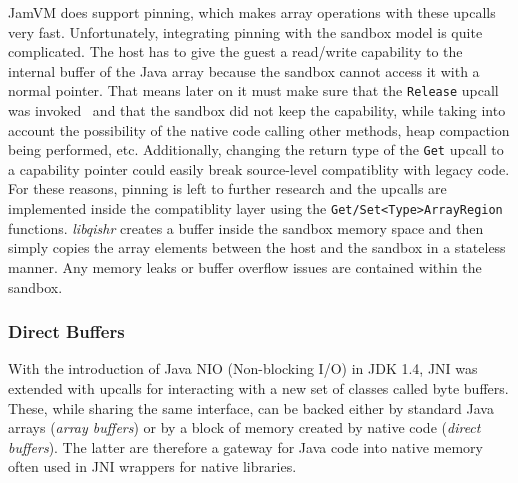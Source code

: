 \documentclass[a4paper,12pt,twoside,openright]{report}
\newcommand{\tool}[1]{\emph{#1}}
\newcommand{\lib}[1]{\tool{lib#1}}
\begin{document}
JamVM does support pinning, which makes array operations with these upcalls very fast. Unfortunately, integrating pinning with the sandbox model is quite complicated. The host has to give the guest a read/write capability to the internal buffer of the Java array because the sandbox cannot access it with a normal pointer. That means later on it must make sure that the \texttt{Release} upcall was invoked~\cite{Kondoh:2008:FBJ:1390630.1390645} and that the sandbox did not keep the capability, while taking into account the possibility of the native code calling other methods, heap compaction being performed, etc. Additionally, changing the return type of the \texttt{Get} upcall to a capability pointer could easily break source-level compatiblity with legacy code. For these reasons, pinning is left to further research and the upcalls are implemented inside the compatiblity layer using the \texttt{Get/Set\-<Type>\-Array\-Region} functions. \lib{qishr} creates a buffer inside the sandbox memory space and then simply copies the array elements between the host and the sandbox in a stateless manner. Any memory leaks or buffer overflow issues are contained within the sandbox.

\label{ArraysCriticalSection}

\subsubsection{Direct Buffers}
\label{sec:DirectBuffers}

With the introduction of Java NIO (Non-blocking I/O) in JDK 1.4, JNI was extended with upcalls for interacting with a new set of classes called byte buffers. These, while sharing the same interface, can be backed either by standard Java arrays (\emph{array buffers}) or by a block of memory created by native code (\emph{direct buffers}). The latter are therefore a gateway for Java code into native memory often used in JNI wrappers for native libraries.
\end{document}
